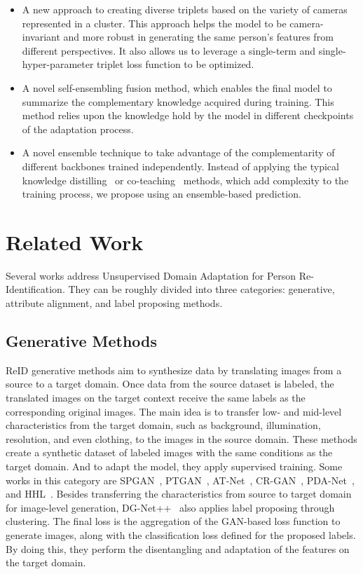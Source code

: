 \documentclass[journal]{IEEEtran}
\begin{document}
\begin{itemize}
    \item A new approach to creating diverse triplets based on the variety of cameras represented in a cluster. 
This approach helps the model to be camera-invariant and more robust in generating the same person's features from different perspectives. It also allows us to leverage a single-term and single-hyper-parameter triplet loss function to be optimized.
    
    \item A novel self-ensembling fusion method, which enables the final model to summarize the complementary knowledge acquired during training. This method relies upon the knowledge hold by the model in different checkpoints of the adaptation process.

    \item A novel ensemble technique to take advantage of the complementarity of different backbones trained independently. Instead of applying the typical knowledge distilling~\cite{hinton2015distilling} or co-teaching~\cite{han2018co, chen2020enhancing} methods, which add complexity to the training process, we propose using an ensemble-based prediction.   
\end{itemize}   

\section{Related Work}
\label{sec:relatedwork}
Several works address Unsupervised Domain Adaptation for Person Re-Identification. They can be roughly divided into three categories: generative, attribute alignment, and label proposing methods.

\subsection{Generative Methods}
ReID generative methods aim to synthesize data by translating images from a source to a target domain. Once data from the source dataset is labeled, the translated images on the target context receive the same labels as the corresponding original images. The main idea is to transfer low- and mid-level characteristics from the target domain, such as background, illumination, resolution, and even clothing, to the images in the source domain. These methods create a synthetic dataset of labeled images with the same conditions as the target domain. And to adapt the model, they apply supervised training. Some works in this category are SPGAN~\cite{deng2018image}, PTGAN~\cite{wei2018person}, AT-Net~\cite{liu2019adaptive}, CR-GAN~\cite{chen2019instance}, PDA-Net~\cite{li2019cross}, and HHL~\cite{zhong2018generalizing}. Besides transferring the characteristics from source to target domain for image-level generation, DG-Net++~\cite{zou2020joint} also applies label proposing through clustering. The final loss is the aggregation of the GAN-based loss function to generate images, along with the classification loss defined for the proposed labels. By doing this, they perform the disentangling and adaptation of the features on the target domain. 
\end{document}
